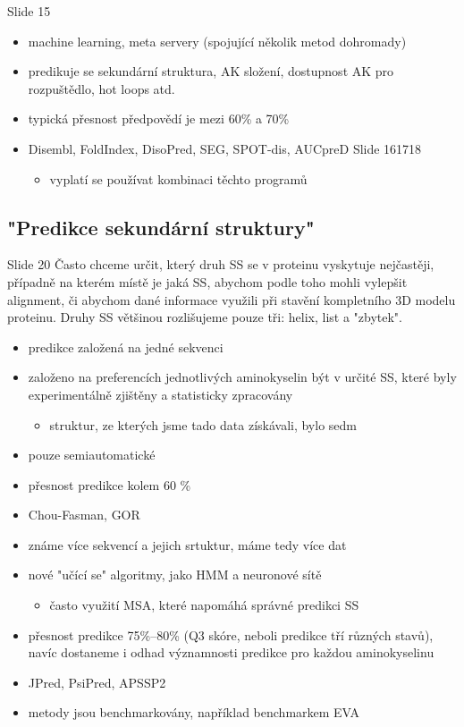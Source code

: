 \documentclass[DIV=8]{scrreprt}
\begin{document}
Slide 15
\begin{itemize}
    \item machine learning, meta servery (spojující několik metod dohromady)
    \item predikuje se sekundární struktura, AK složení, dostupnost AK pro rozpuštědlo, hot loops atd.
    \item typická přesnost předpovědí je mezi 60\% a 70\%
    \item Disembl, FoldIndex, DisoPred, SEG, SPOT-dis, AUCpreD Slide 161718
\begin{itemize}
    \item vyplatí se používat kombinaci těchto programů
\end{itemize}

\end{itemize}


\subsection{"Predikce sekundární struktury"}

Slide 20
Často chceme určit, který druh SS se v proteinu vyskytuje nejčastěji, případně na kterém místě je jaká SS, abychom podle toho mohli vylepšit alignment, či abychom dané informace využili při stavění kompletního 3D modelu proteinu. Druhy SS většinou rozlišujeme pouze tři: helix, list a "zbytek".

\begin{itemize}
    \item predikce založená na jedné sekvenci
    \item založeno na preferencích jednotlivých aminokyselin být v určité SS, které byly experimentálně zjištěny a statisticky zpracovány
\begin{itemize}
    \item struktur, ze kterých jsme tado data získávali, bylo sedm
\end{itemize}

    \item pouze semiautomatické
    \item přesnost predikce kolem 60 \%
    \item Chou-Fasman, GOR
\end{itemize}


\begin{itemize}
    \item známe více sekvencí a jejich srtuktur, máme tedy více dat
    \item nové "učící se" algoritmy, jako HMM a neuronové sítě
\begin{itemize}
    \item často využití MSA, které napomáhá správné predikci SS
\end{itemize}

    \item přesnost predikce 75\%--80\% (Q3 skóre, neboli predikce tří různých stavů), navíc dostaneme i odhad významnosti predikce pro každou aminokyselinu
    \item JPred, PsiPred, APSSP2
    \item metody jsou benchmarkovány, například benchmarkem EVA
\end{itemize}
\end{document}
